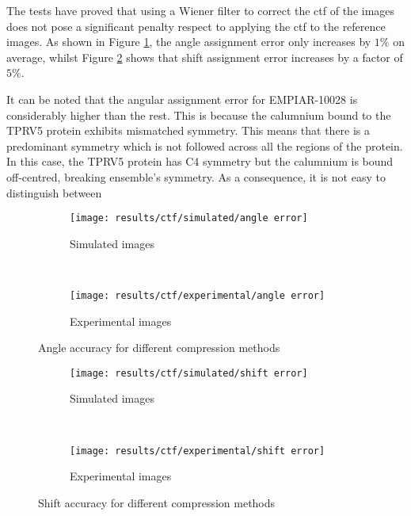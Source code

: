 \documentclass[../main.tex]{subfiles}
\begin{document}
The tests have proved that using a Wiener filter to correct the \gls{ctf} of the images does not pose a significant penalty respect to applying the \gls{ctf} to the reference images. As shown in Figure \ref{fig:5:ctf_angle_accuracy}, the angle assignment error only increases by $1 \si{\percent}$ on average, whilst Figure \ref{fig:5:ctf_shift_accuracy} shows that shift assignment error increases by a factor of $5 \si{\percent}$. 

It can be noted that the angular assignment error for EMPIAR-10028 is considerably higher than the rest. This is because the calumnium bound to the TPRV5 protein exhibits mismatched symmetry. This means that there is a predominant symmetry which is not followed across all the regions of the protein. In this case, the TPRV5 protein has C4 symmetry but the calumnium is bound off-centred, breaking ensemble's symmetry. As a consequence, it is not easy to distinguish between 

\begin{figure}[htbp]
    \centering
    \begin{subfigure}[b]{.8\textwidth}
         \centering
         \texttt{[image: results/ctf/simulated/angle error]}
         \caption{Simulated images}
    \end{subfigure}\\
    \vspace{2em}
    \begin{subfigure}[b]{.8\textwidth}
         \centering
         \texttt{[image: results/ctf/experimental/angle error]}
         \caption{Experimental images}
    \end{subfigure}
    \caption{Angle accuracy for different compression methods}
    \label{fig:5:ctf_angle_accuracy}
\end{figure}

\begin{figure}[htbp]
    \centering
    \begin{subfigure}[b]{.8\textwidth}
         \centering
         \texttt{[image: results/ctf/simulated/shift error]}
         \caption{Simulated images}
    \end{subfigure}\\
    \vspace{2em}
    \begin{subfigure}[b]{.8\textwidth}
         \centering
         \texttt{[image: results/ctf/experimental/shift error]}
         \caption{Experimental images}
    \end{subfigure}
    \caption{Shift accuracy for different compression methods}
    \label{fig:5:ctf_shift_accuracy}
\end{figure}
\end{document}

